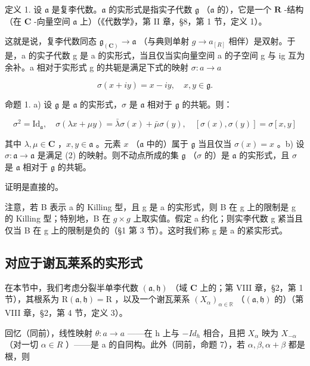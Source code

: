 定义 1. 设 \(\mathfrak{a}\) 是复李代数。\(\mathfrak{a}\) 的实形式是指实子代数 \(\mathfrak{g}\) （\(\mathfrak{a}\) 的），它是一个 \(\mathbf{R}\) -结构（在 \(\mathbf{C}\) -向量空间 \(\mathfrak{a}\) 上）（《代数学》，第 II 章，§8，第 1 节，定义 1）。

这就是说，复李代数同态 \(\mathfrak{g}_{(\mathbf{C})}\to\mathfrak{a}\) （与典则单射 \(g\to a_{[R]}\) 相伴）是双射。于是，a 的实子代数 g 是 a 的实形式，当且仅当实向量空间 a 的子空间 g 与 ig 互为余补。a 相对于实形式 g 的共轭是满足下式的映射 \(\sigma:a\to a\)

\[
\sigma (x + i y) = x - i y, \quad x, y \in \mathfrak {g}.\tag{1}
\]

命题 1. a) 设 \(\mathfrak{g}\) 是 \(\mathfrak{a}\) 的实形式，\(\sigma\) 是 \(\mathfrak{a}\) 相对于 \(\mathfrak{g}\) 的共轭。则：

\[
\sigma^ {2} = \mathrm{Id} _ {\mathfrak {a}}, \quad \sigma (\lambda x + \mu y) = \bar {\lambda} \sigma (x) + \bar {\mu} \sigma (y), \quad [ \sigma (x), \sigma (y) ] = \sigma [ x, y ]\tag{2}
\]

其中 \(\lambda, \mu \in \mathbf{C}\) ，\(x, y \in \mathfrak{a}\) 。元素 \(x\) （\(\mathfrak{a}\) 中的）属于 \(\mathfrak{g}\) 当且仅当 \(\sigma(x) = x\) 。b) 设 \(\sigma: \mathfrak{a} \to \mathfrak{a}\) 是满足 (2) 的映射。则不动点所成的集 \(\mathfrak{g}\) （\(\sigma\) 的）是 \(\mathfrak{a}\) 的实形式，且 \(\sigma\) 是 \(\mathfrak{a}\) 相对于 \(\mathfrak{g}\) 的共轭。

证明是直接的。

注意，若 B 表示 a 的 Killing 型，且 g 是 a 的实形式，则 B 在 g 上的限制是 g 的 Killing 型；特别地，B 在 \(g \times g\) 上取实值。假定 a 约化；则实李代数 g 紧当且仅当 B 在 g 上的限制是负的（§1 第 3 节）。这时我们称 g 是 a 的紧实形式。

\subsection{对应于谢瓦莱系的实形式}

在本节中，我们考虑分裂半单李代数 \((\mathfrak{a},\mathfrak{h})\) （域 \(\mathbf{C}\) 上的；第 VIII 章，§2，第 1 节），其根系为 \(\mathrm{R}(\mathfrak{a},\mathfrak{h}) = \mathrm{R}\) ，以及一个谢瓦莱系 \((X_{\alpha})_{\alpha \in \mathbb{R}}\) （\((\mathfrak{a},\mathfrak{h})\) 的）（第 VIII 章，§2，第 4 节，定义 3）。

回忆（同前），线性映射 \(\theta: a \to a\) ——在 h 上与 \(-Id_{h}\) 相合，且把 \(X_{\alpha}\) 映为 \(X_{-\alpha}\) （对一切 \(\alpha \in R\) ）——是 a 的自同构。此外（同前，命题 7），若 \(\alpha, \beta, \alpha + \beta\) 都是根，则

